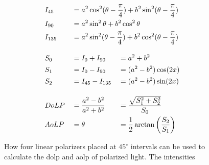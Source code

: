 \begin{figure}[H]
\begin{minipage}{.48\textwidth}
\begin{alignat}{3}
             & I_{45}                                                                         & 
             & = \mathrlap{a^2\cos^2(\theta-\frac{\pi}{4}) + b^2\sin^2(\theta-\frac{\pi}{4})} & 
             &                                                                                   \\
             & I_{90}                                                                         & 
             & = \mathrlap{a^2\sin^2\theta + b^2\cos^2\theta                                } & 
             &                                                                                   \\
             & I_{135}                                                                        & 
             & = \mathrlap{a^2\sin^2(\theta-\frac{\pi}{4}) + b^2\cos^2(\theta-\frac{\pi}{4})} & 
             &                                                                                   \\[1em]
             & S_0                                                                            & 
             & = I_0 + I_{90}                                                                 & 
             & = a^2+b^2                                                                         \\
             & S_1                                                                            & 
             & = I_0 - I_{90}                                                                 & 
             & =(a^2-b^2)\cos(2x)                                                                \\
             & S_2                                                                            & 
             & = I_{45} - I_{135}                                                             & 
             & =(a^2-b^2)\sin(2x)                                                                \\[1em]
             & DoLP                                                                           & 
             & =\frac{a^2-b^2}{a^2+b^2}                                                       & 
             & = \frac{\sqrt{S_1^2 + S_2^2}}{S_0}                                                \\
             & AoLP                                                                           & 
             & =  \theta                                                                      & 
             & = \frac{1}{2}\arctan{\left(\frac{S_2}{S_1}\right)}
        \end{alignat}
    \end{minipage}%
    
    \caption{How four linear polarizers placed at $45^\circ$ intervals can be used to calculate the \gls{dolp} and \gls{aolp} of polarized light. The intensities  \label{fig:polarization_calculation}}
\end{figure}

